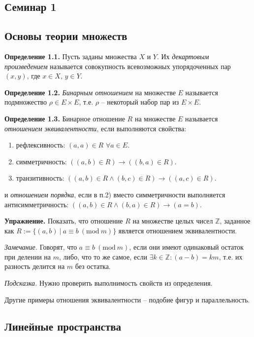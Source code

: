 \documentclass[a4paper, 12pt]{article}
\begin{document}
\begin{spacing}{1.5}
\setlength{\parindent}{0ex}

\section*{Семинар 1}


\subsection*{Основы теории множеств}

\textbf{Определение 1.1.}
Пусть заданы множества $X$ и $Y$. Их \textit{декартовым произведением} называется совокупность всевозможных упорядоченных пар $(x,y)$, где $x \in X$, $y \in Y$.

\textbf{Определение 1.2.}
\textit{Бинарным отношением} на множестве $E$ называется подмножество $\rho \in E \times E$, т.е. $\rho$ -- некоторый набор пар из $E \times E$.

\textbf{Определение 1.3.}
Бинарное отношение $R$ на множестве $E$ называется \textit{отношением эквивалентности}, если выполняются свойства:
\begin{enumerate}[noitemsep]
    \item рефлексивность: $(a,a) \in R$ $\forall a \in E$.
    \item симметричность: $((a,b) \in R) \rightarrow ((b,a) \in R)$.
    \item транзитивность: $((a,b) \in R \wedge (b,c) \in R) \rightarrow ((a,c) \in R)$.
\end{enumerate}
и \textit{отношением порядка}, если в п.2) вместо симметричности выполняется антисимметричность: $((a,b) \in R \wedge (b,a) \in R) \rightarrow (a = b)$.

\textbf{Упражнение.} Показать, что отношение $R$ на множестве целых чисел $\mathbb{Z}$, заданное как $R := \{ (a,b) \ | \ a \equiv b \ (\mathrm{mod} \ m) \}$ является отношением эквивалентности.

\textit{Замечание.} Говорят, что $a \equiv b \ (\mathrm{mod} \ m)$, если они имеют одинаковый остаток при делении на $m$, либо, что то же самое, если $\exists k \in \mathbb{Z}: (a-b) = km$, т.е. их разность делится на $m$ без остатка. 

\textit{Подсказка.} Нужно проверить выполнимость свойств из определения.

Другие примеры отношения эквивалентности -- подобие фигур и параллельность.


\subsection*{Линейные пространства}


\end{spacing}
\end{document}
